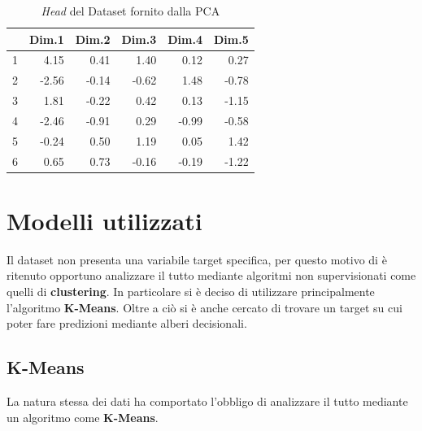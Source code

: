 \documentclass[letterpaper,11pt]{article}
\begin{document}
\begin{table}[h!t]
\centering
\begin{tabular}{rrrrrr}
  \hline
 & Dim.1 & Dim.2 & Dim.3 & Dim.4 & Dim.5 \\ 
  \hline
1 & 4.15 & 0.41 & 1.40 & 0.12 & 0.27 \\ 
  2 & -2.56 & -0.14 & -0.62 & 1.48 & -0.78 \\ 
  3 & 1.81 & -0.22 & 0.42 & 0.13 & -1.15 \\ 
  4 & -2.46 & -0.91 & 0.29 & -0.99 & -0.58 \\ 
  5 & -0.24 & 0.50 & 1.19 & 0.05 & 1.42 \\ 
  6 & 0.65 & 0.73 & -0.16 & -0.19 & -1.22 \\ 
   \hline
\end{tabular}
\caption{\textit{Head} del Dataset fornito dalla PCA}
\label{fig:PCADataset}
\end{table}


\section{Modelli utilizzati}
Il dataset non presenta una variabile target specifica, per questo motivo di è ritenuto opportuno analizzare il tutto mediante algoritmi non supervisionati come quelli di \textbf{clustering}. In particolare si è deciso di utilizzare principalmente l'algoritmo \textbf{K-Means}. Oltre a ciò si è anche cercato di trovare un target su cui poter fare predizioni mediante alberi decisionali.

\subsection{K-Means}
La natura stessa dei dati ha comportato l'obbligo di analizzare il tutto mediante un algoritmo come \textbf{K-Means}. 
\end{document}
